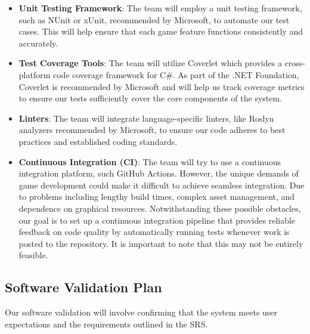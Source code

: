\documentclass[12pt, titlepage]{article}
\begin{document}
  \begin{itemize}
    \item \textbf{Unit Testing Framework}: The team will employ a unit testing framework, such as NUnit or xUnit, recommended by Microsoft, to automate our test cases. This will help ensure that each game feature functions consistently and accurately.
    \item \textbf{Test Coverage Tools}: The team will utilize Coverlet which provides a cross-platform code coverage framework for C\#. As part of the .NET Foundation, Coverlet is recommended by Microsoft and will help us track coverage metrics to ensure our tests sufficiently cover the core components of the system.
    \item \textbf{Linters}: The team will integrate language-specific linters, like Roslyn analyzers recommended by Microsoft, to ensure our code adheres to best practices and established coding standards.
    \item \textbf{Continuous Integration (CI)}: The team will try to use a continuous integration platform, such GitHub Actions. However, the unique demands of game development could make it difficult to achieve seamless integration. Due to problems including lengthy build times, complex asset management, and dependence on graphical resources. Notwithstanding these possible obstacles, our goal is to set up a continuous integration pipeline that provides reliable feedback on code quality by automatically running tests whenever work is posted to the repository. It is important to note that this may not be entirely feasible.
  \end{itemize}

\subsection{Software Validation Plan}

\noindent Our software validation will involve confirming that the system meets user expectations and the requirements outlined in the SRS.
\end{document}
